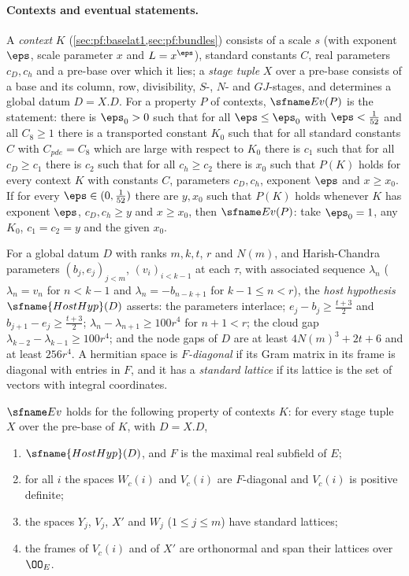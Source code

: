 \paragraph{Contexts and eventual statements.} A \emph{context} $K$ (\cref{sec:pf:baselat1,sec:pf:bundles}) consists of a scale $s$
(with exponent $\eps$, scale parameter $x$ and $L=x^\eps$), standard constants $C$, real parameters $c_D,c_h$ and a pre-base over which
it lies; a \emph{stage tuple} $X$ over a pre-base consists of a base and its column, row, divisibility, $S$-, $N$- and $GJ$-stages, and
determines a global datum $D=X.D$. For a property $P$ of contexts, $\shdivEv(P)$ is the statement: there is $\eps_0>0$ such that for
all $\eps\le\eps_0$ with $\eps<\frac1{52}$ and all $C_8\ge1$ there is a transported constant $K_0$ such that for all standard constants
$C$ with $C_{pde}=C_8$ which are large with respect to $K_0$ there is $c_1$ such that for all $c_D\ge c_1$ there is $c_2$ such that for all
$c_h\ge c_2$ there is $x_0$ such that $P(K)$ holds for every context $K$ with constants $C$, parameters $c_D,c_h$, exponent $\eps$ and
$x\ge x_0$. If for every $\eps\in(0,\frac1{52})$ there are $y,x_0$ such that $P(K)$ holds whenever $K$ has exponent $\eps$, $c_D,c_h\ge y$ and
$x\ge x_0$, then $\shdivEv(P)$: take $\eps_0=1$, any $K_0$, $c_1=c_2=y$ and the given $x_0$.

For a global datum $D$ with ranks $m,k,t$, $r$ and $N(m)$, and Harish-Chandra parameters $(b_j,e_j)_{j<m}$, $(v_i)_{i<k-1}$ at each
$\tau$, with associated sequence $\lambda_n$ ($\lambda_n=v_n$ for $n<k-1$ and $\lambda_n=-b_{n-k+1}$ for $k-1\le n<r$), the \emph{host
hypothesis} $\sfname{HostHyp}(D)$ asserts: the parameters interlace; $e_j-b_j\ge\frac{t+3}2$ and $b_{j+1}-e_j\ge\frac{t+3}2$; $\lambda_n-\lambda_{n+1}\ge
100r^4$ for $n+1<r$; the cloud gap $\lambda_{k-2}-\lambda_{k-1}\ge100r^4$; and the node gaps of $D$ are at least $4N(m)^3+2t+6$ and at
least $256r^4$. A hermitian space is \emph{$F$-diagonal} if its Gram matrix in its frame is diagonal with entries in $F$, and it has a
\emph{standard lattice} if its lattice is the set of vectors with integral coordinates.

\begin{theorem}\label{pf:sh-div:hostframes}
$\shdivEv$ holds for the following property of contexts $K$: for every stage tuple $X$ over the pre-base of $K$, with $D=X.D$,
\begin{enumerate}[label=(\roman*)]
\item $\sfname{HostHyp}(D)$, and $F$ is the maximal real subfield of $E$;
\item for all $i$ the spaces $W_c(i)$ and $V_c(i)$ are $F$-diagonal and $V_c(i)$ is positive definite;
\item the spaces $Y_j$, $V_j$, $X'$ and $W_j$ ($1\le j\le m$) have standard lattices;
\item the frames of $V_c(i)$ and of $X'$ are orthonormal and span their lattices over $\OO_E$.
\end{enumerate}
\end{theorem}


